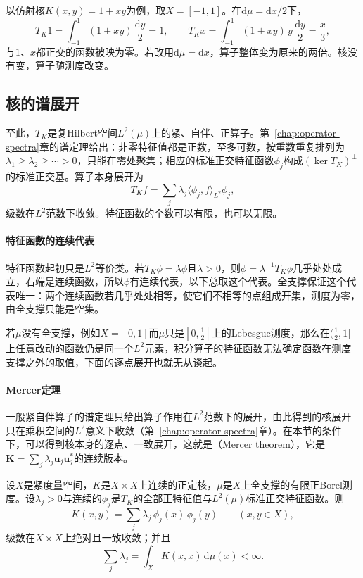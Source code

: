 以仿射核$K(x,y)=1+xy$为例，取$X=[-1,1]$。在$\mathrm d\mu=\mathrm dx/2$下，
\[
T_K1=\int_{-1}^1(1+xy)\,\frac{\mathrm dy}{2}=1,\qquad
T_Kx=\int_{-1}^1(1+xy)\,y\,\frac{\mathrm dy}{2}=\frac x3 ,
\]
与$1$、$x$都正交的函数被映为零。若改用$\mathrm d\mu=\mathrm dx$，算子整体变为原来的两倍。核没有变，算子随测度改变。

\subsection{核的谱展开}
\label{sec:rkhs-spectral-expansion}

至此，$T_K$是复Hilbert空间$L^2(\mu)$上的紧、自伴、正算子。第~\ref{chap:operator-spectra}章的谱定理给出：非零特征值都是正数，至多可数，按重数重复排列为$\lambda_1\geq\lambda_2\geq\cdots>0$，只能在零处聚集；相应的标准正交特征函数$\phi_j$构成$(\ker T_K)^\perp$的标准正交基。算子本身展开为
\[
T_Kf=\sum_j\lambda_j\langle\phi_j,f\rangle_{L^2}\phi_j ,
\]
级数在$L^2$范数下收敛。特征函数的个数可以有限，也可以无限。

\paragraph{特征函数的连续代表}

特征函数起初只是$L^2$等价类。若$T_K\phi=\lambda\phi$且$\lambda>0$，则$\phi=\lambda^{-1}T_K\phi$几乎处处成立，右端是连续函数，所以$\phi$有连续代表，以下总取这个代表。全支撑保证这个代表唯一：两个连续函数若几乎处处相等，使它们不相等的点组成开集，测度为零，由全支撑只能是空集。

若$\mu$没有全支撑，例如$X=[0,1]$而$\mu$只是$[0,\tfrac12]$上的Lebesgue测度，那么在$(\tfrac12,1]$上任意改动的函数仍是同一个$L^2$元素，积分算子的特征函数无法确定函数在测度支撑之外的取值，下面的逐点展开也就无从谈起。

\paragraph{Mercer定理}

一般紧自伴算子的谱定理只给出算子作用在$L^2$范数下的展开，由此得到的核展开只在乘积空间的$L^2$意义下收敛（第~\ref{chap:operator-spectra}章）。在本节的条件下，可以得到核本身的逐点、一致展开，这就是（Mercer theorem），它是$\bm K=\sum_j\lambda_j\bm u_j\bm u_j^*$的连续版本。

\begin{theorem}[Mercer定理]
\label{thm:rkhs-mercer}
设$X$是紧度量空间，$K$是$X\times X$上连续的正定核，$\mu$是$X$上全支撑的有限正Borel测度。设$\lambda_j>0$与连续的$\phi_j$是$T_K$的全部正特征值与$L^2(\mu)$标准正交特征函数。则
\begin{equation}
K(x,y)=\sum_j\lambda_j\,\phi_j(x)\,\overline{\phi_j(y)}\qquad(x,y\in X),
\label{eq:rkhs-mercer}
\end{equation}
级数在$X\times X$上绝对且一致收敛；并且
\begin{equation}
\sum_j\lambda_j=\int_XK(x,x)\,\mathrm d\mu(x)<\infty .
\label{eq:rkhs-mercer-trace}
\end{equation}
\end{theorem}

